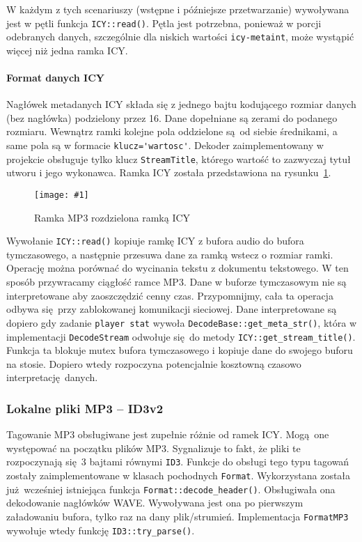 \documentclass[polish]{aghengthesis}
\newcommand{\imgint}[4]{
	\begin{figure}[{#4}]
		\centering
		\texttt{[image: \#1]}
		\caption{#2}
		\label{#1}
	\end{figure}
}
\newcommand{\imgh}[3]{\imgint{#1}{#2}{#3}{H}}
\begin{document}
			W każdym z tych scenariuszy (wstępne i późniejsze przetwarzanie) wywoływana jest w pętli funkcja \lstinline|ICY::read()|. Pętla jest potrzebna, ponieważ w porcji odebranych danych, szczególnie dla niskich wartości \lstinline|icy-metaint|, może wystąpić więcej niż jedna ramka ICY.
			
			\paragraph{Format danych ICY}
				Nagłówek metadanych ICY składa się z jednego bajtu kodującego rozmiar danych (bez nagłówka) podzielony przez 16. Dane dopełniane są zerami do podanego rozmiaru. Wewnątrz ramki kolejne pola oddzielone są od siebie średnikami, a same pola są w formacie \lstinline|klucz='wartosc'|. Dekoder zaimplementowany w projekcie obsługuje tylko klucz \lstinline|StreamTitle|, którego wartość to zazwyczaj tytuł utworu i jego wykonawca. Ramka ICY została przedstawiona na rysunku~\ref{3/PicoRadio-icy}.
				
			\imgh{3/PicoRadio-icy}{Ramka MP3 rozdzielona ramką ICY}{0.9}
				
			Wywołanie \lstinline|ICY::read()| kopiuje ramkę ICY z bufora audio do bufora tymczasowego, a następnie przesuwa dane za ramką wstecz o rozmiar ramki. Operację można porównać do wycinania tekstu z dokumentu tekstowego. W ten sposób przywracamy ciągłość ramce MP3. Dane w buforze tymczasowym nie są interpretowane aby zaoszczędzić cenny czas. Przypomnijmy, cała ta operacja odbywa się przy zablokowanej komunikacji sieciowej. Dane interpretowane są dopiero gdy zadanie \lstinline|player stat| wywoła \lstinline|DecodeBase::get_meta_str()|, która w implementacji \lstinline|DecodeStream| odwołuje się do metody \lstinline|ICY::get_stream_title()|. Funkcja ta blokuje mutex bufora tymczasowego i kopiuje dane do swojego buforu na stosie. Dopiero wtedy rozpoczyna potencjalnie kosztowną czasowo interpretację danych.
		
		\subsubsection{Lokalne pliki MP3 -- ID3v2}
			Tagowanie MP3 obsługiwane jest zupełnie różnie od ramek ICY. Mogą one występować na początku plików MP3. Sygnalizuje to fakt, że pliki te rozpoczynają się 3 bajtami równymi \lstinline|ID3|. Funkcje do obsługi tego typu tagowań zostały zaimplementowane w klasach pochodnych \lstinline|Format|. Wykorzystana została już wcześniej istniejąca funkcja \lstinline|Format::decode_header()|. Obsługiwała ona dekodowanie nagłówków WAVE. Wywoływana jest ona po pierwszym załadowaniu bufora, tylko raz na dany plik/strumień. Implementacja \lstinline|FormatMP3| wywołuje wtedy funkcję \lstinline|ID3::try_parse()|.
			
\end{document}
